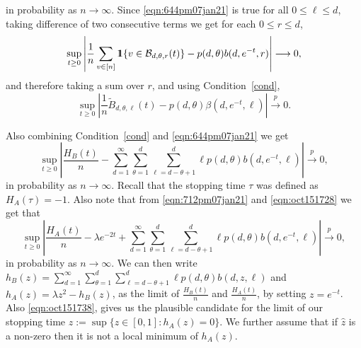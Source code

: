 \documentclass[11pt]{article}
\def\ind{{\rm 1\hspace{-0.90ex}1}}
\def\top{\stackrel{p}{\longrightarrow}}
\newcommand{\cB}{\mathcal{B}}
\def\top{\stackrel{p}{\longrightarrow}}
\begin{document}
in probability as $n \rightarrow \infty$. Since \eqref{eqn:644pm07jan21} is true for all $0\leq \ell \leq d$, taking difference of two consecutive terms we get for each $0\leq r\leq d$,
\begin{equation*}
     \sup_{t\geq 0} \left| \frac{1}{n} \sum_{v \in [n]}\ind\{v \in \cB_{d,\theta,r}(t)\} -p(d,\theta)b(d,e^{-t},r) \right|\longrightarrow 0,
\end{equation*}
and therefore taking a sum over $r$, and using  Condition~\ref{cond},
\begin{equation*}%
     \sup_{t\geq 0} \left| \frac{1}{n} \widetilde{B}_{d,\theta,\ell}(t) -p(d,\theta)\beta(d,e^{-t},\ell) \right|\top  0.
\end{equation*}

Also combining Condition~\ref{cond} and \eqref{eqn:644pm07jan21}  we get
\begin{equation}\label{eqn:712pm07jan21}
   \sup_{t \geq 0} \left| \frac{H_B(t)}{n}  -  \sum_{d=1}^{\infty}\sum_{\theta=1}^{d}\sum_{\ell= d-\theta+1}^{d} \ell p(d,\theta)b(d,e^{-t},\ell)\right| \top 0,
\end{equation}
in probability as $n \rightarrow \infty$.
Recall that the stopping time $\tau$ was defined as $H_A(\tau) = -1$. Also note that from \eqref{eqn:712pm07jan21} and \eqref{eqn:oct151728} we get that
\begin{equation}\label{eqn:oct151738}
  \sup_{t \geq 0}\left|  \frac{H_A(t)}{n} - \lambda e^{-2t} + \sum_{d=1}^{\infty}\sum_{\theta=1}^{d}\sum_{\ell= d-\theta+1}^{d} \ell  p(d,\theta)b(d,e^{-t},\ell)\right| \top 0,
\end{equation}
in probability as $n \rightarrow \infty$.
We can then  write 
$h_B(z) =\sum_{d=1}^{\infty}\sum_{\theta=1}^{d}\sum_{\ell= d-\theta+1}^{d} \ell p(d,\theta)b(d,z,\ell)$ and $h_A(z)=\lambda  z^2 - h_B(z)$, as the limit of $\frac{H_B(t)}{n}$ and $\frac{H_A(t)}{n}$, by setting $z=e^{-t}$. Also \eqref{eqn:oct151738}, gives us the plausible candidate for the limit of our stopping time
$
\widehat{z} :=\sup\{z\in [0,1]: h_A(z)=0 \}.
$
We further assume that if $\widehat{z}$ is a non-zero then it is not a local minimum of $h_A(z)$.
\end{document}
